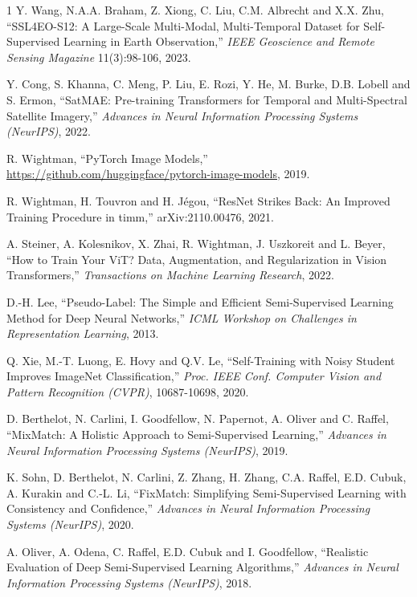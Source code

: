 \documentclass[twoside,a4paper,11pt]{article}
\begin{document}
\begin{thebibliography}{1}
Y. Wang, N.A.A. Braham, Z. Xiong, C. Liu, C.M. Albrecht and X.X. Zhu, ``{SSL4EO-S12}: A Large-Scale Multi-Modal, Multi-Temporal Dataset for Self-Supervised Learning in Earth Observation,'' {\em IEEE Geoscience and Remote Sensing Magazine} 11(3):98-106, 2023.

Y. Cong, S. Khanna, C. Meng, P. Liu, E. Rozi, Y. He, M. Burke, D.B. Lobell and S. Ermon, ``{SatMAE}: Pre-training Transformers for Temporal and Multi-Spectral Satellite Imagery,'' {\em Advances in Neural Information Processing Systems (NeurIPS)}, 2022.

R. Wightman, ``{PyTorch} Image Models,'' \url{https://github.com/huggingface/pytorch-image-models}, 2019.

R. Wightman, H. Touvron and H. J{\'e}gou, ``{ResNet} Strikes Back: An Improved Training Procedure in {timm},'' arXiv:2110.00476, 2021.

A. Steiner, A. Kolesnikov, X. Zhai, R. Wightman, J. Uszkoreit and L. Beyer, ``How to Train Your {ViT}? Data, Augmentation, and Regularization in Vision Transformers,'' {\em Transactions on Machine Learning Research}, 2022.

D.-H. Lee, ``Pseudo-Label: The Simple and Efficient Semi-Supervised Learning Method for Deep Neural Networks,'' {\em ICML Workshop on Challenges in Representation Learning}, 2013.

Q. Xie, M.-T. Luong, E. Hovy and Q.V. Le, ``Self-Training with Noisy Student Improves {ImageNet} Classification,'' {\em Proc. IEEE Conf. Computer Vision and Pattern Recognition (CVPR)}, 10687-10698, 2020.

D. Berthelot, N. Carlini, I. Goodfellow, N. Papernot, A. Oliver and C. Raffel, ``{MixMatch}: A Holistic Approach to Semi-Supervised Learning,'' {\em Advances in Neural Information Processing Systems (NeurIPS)}, 2019.

K. Sohn, D. Berthelot, N. Carlini, Z. Zhang, H. Zhang, C.A. Raffel, E.D. Cubuk, A. Kurakin and C.-L. Li, ``{FixMatch}: Simplifying Semi-Supervised Learning with Consistency and Confidence,'' {\em Advances in Neural Information Processing Systems (NeurIPS)}, 2020.

A. Oliver, A. Odena, C. Raffel, E.D. Cubuk and I. Goodfellow, ``Realistic Evaluation of Deep Semi-Supervised Learning Algorithms,'' {\em Advances in Neural Information Processing Systems (NeurIPS)}, 2018.


\end{thebibliography}
\end{document}
